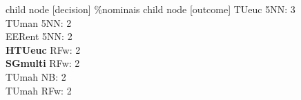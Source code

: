 child {node [decision] {\%nominais}
child {node [outcome] {
TUeuc 5NN: 3\\
TUman 5NN: 2\\
EERent 5NN: 2\\
\textbf{HTUeuc} RFw: 2\\
\textbf{SGmulti} RFw: 2\\
TUmah NB: 2\\
TUmah RFw: 2\\
}}}
